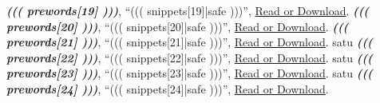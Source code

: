 \documentclass{article}
\begin{document}
\begin{thebibliography}{99}
\emph{\textbf{((( prewords[19] )))}}, ``{((( snippets[19]|safe )))}'', \href{((( lander[19] )))}{Read or Download}.
\emph{\textbf{((( prewords[20] )))}}, ``{((( snippets[20]|safe )))}'', \href{((( lander[20] )))}{Read or Download}.
\emph{\textbf{((( prewords[21] )))}}, ``{((( snippets[21]|safe )))}'', \href{((( lander[21] )))}{Read or Download}.
satu
\emph{\textbf{((( prewords[22] )))}}, ``{((( snippets[22]|safe )))}'', \href{((( lander[22] )))}{Read or Download}.
satu
\emph{\textbf{((( prewords[23] )))}}, ``{((( snippets[23]|safe )))}'', \href{((( lander[23] )))}{Read or Download}.
satu
\emph{\textbf{((( prewords[24] )))}}, ``{((( snippets[24]|safe )))}'', \href{((( lander[24] )))}{Read or Download}.

\end{thebibliography}
\end{document}
